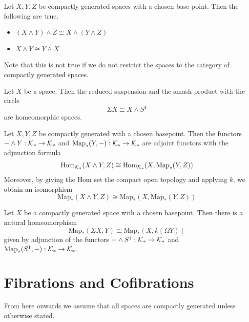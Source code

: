 \documentclass[a4paper]{article}
\begin{document}
\begin{prp}{}{} Let $X,Y,Z$ be compactly generated spaces with a chosen base point. Then the following are true. 
\begin{itemize}
\item $(X\wedge Y)\wedge Z\cong X\wedge(Y\wedge Z)$
\item $X\wedge Y\cong Y\wedge X$
\end{itemize}
\end{prp}

Note that this is not true if we do not restrict the spaces to the category of compactly generated spaces. 

\begin{lmm}{}{} Let $X$ be a space. Then the reduced suspension and the smash product with the circle $$\Sigma X\cong X\wedge S^1$$ are homeomorphic spaces. 
\end{lmm}

\begin{thm}{}{} Let $X,Y,Z$ be compactly generated with a chosen basepoint. Then the functors $-\wedge Y:\mathcal{K}_\ast\to\mathcal{K}_\ast$ and $\text{Map}_\ast(Y,-):\mathcal{K}_\ast\to\mathcal{K}_\ast$ are adjoint functors with the adjunction formula $$\operatorname{Hom}_{\mathcal{K}_\ast}(X\wedge Y,Z)\cong\operatorname{Hom}_{\mathcal{K}_\ast}(X,\text{Map}_\ast(Y,Z))$$ Moreover, by giving the Hom set the compact open topology and applying $k$, we obtain an isomorphism $$\text{Map}_\ast(X\wedge Y,Z)\cong\text{Map}_\ast(X,\text{Map}_\ast(Y,Z))$$
\end{thm}

\begin{crl}{}{} Let $X$ be a compactly generated space with a chosen basepoint. Then there is a natural homeomorphism $$\text{Map}_\ast(\Sigma X,Y)\cong\text{Map}_\ast(X,k(\Omega Y))$$ given by adjunction of the functors $-\wedge S^1:\mathcal{K}_\ast\to\mathcal{K}_\ast$ and $\text{Map}_\ast(S^1,-):\mathcal{K}_\ast\to\mathcal{K}_\ast$. 
\end{crl}

\pagebreak
\section{Fibrations and Cofibrations}
From here onwards we assume that all spaces are compactly generated unless otherwise stated. 
\end{document}
